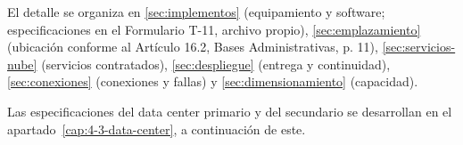 El detalle se organiza en \ref{sec:implementos} (equipamiento y software; especificaciones en el Formulario T-11, archivo propio), \ref{sec:emplazamiento} (ubicación conforme al Artículo 16.2, Bases Administrativas, p. 11), \ref{sec:servicios-nube} (servicios contratados), \ref{sec:despliegue} (entrega y continuidad), \ref{sec:conexiones} (conexiones y fallas) y \ref{sec:dimensionamiento} (capacidad).

Las especificaciones del data center primario y del secundario se desarrollan en el apartado~\ref{cap:4-3-data-center}, a continuación de este.

\label{fuente-02-0-arquitectura-fisica-fin}
